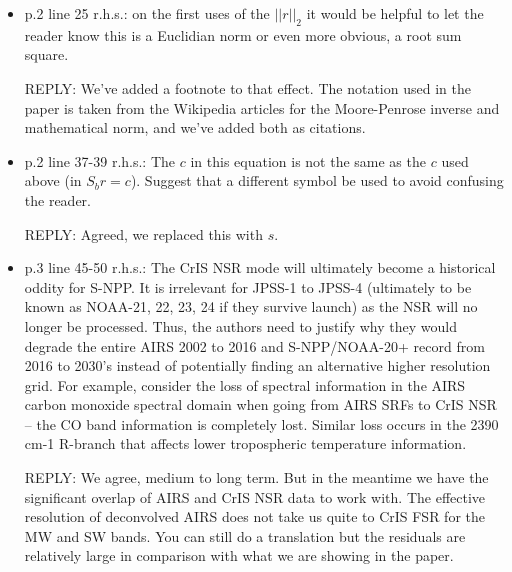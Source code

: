 \documentclass[11pt]{article}
\newcommand {\reply} {\mbox{\small REPLY}}
\begin{document}
\begin{itemize}
  \reply: It's interesting to look at the SRFs this way, and as you
  note the Gaussian approximation does not have the long tails of
  the tabulated SRFs.  We've added a comment to this effect.  But we
  aren't proposing to use the approximation as an alternative to the
  tabulated SRFS.  The applications are (1) reference truth for the
  deconvolved radiances at a different spacing and resolving power,
  used for validation of the deconvolution, and (2) basis functions
  for the idealized grating model of section~4.

\item p.2 line 25 r.h.s.: on the first uses of the $||r||_2$ it
  would be helpful to let the reader know this is a Euclidian norm
  or even more obvious, a root sum square.

  \reply: We've added a footnote to that effect.  The notation used
  in the paper is taken from the Wikipedia articles for the
  Moore-Penrose inverse and mathematical norm, and we've added both
  as citations.

\item p.2 line 37-39 r.h.s.: The $c$ in this equation is not the
  same as the $c$ used above (in $S_b r = c$). Suggest that a
  different symbol be used to avoid confusing the reader.

  \reply: Agreed, we replaced this with $s$.

\item p.3 line 45-50 r.h.s.: The CrIS NSR mode will ultimately
  become a historical oddity for S-NPP. It is irrelevant for JPSS-1
  to JPSS-4 (ultimately to be known as NOAA-21, 22, 23, 24 if they
  survive launch) as the NSR will no longer be processed. Thus, the
  authors need to justify why they would degrade the entire AIRS
  2002 to 2016 and S-NPP/NOAA-20+ record from 2016 to 2030’s instead
  of potentially finding an alternative higher resolution grid. For
  example, consider the loss of spectral information in the AIRS
  carbon monoxide spectral domain when going from AIRS SRFs to CrIS
  NSR – the CO band information is completely lost. Similar loss
  occurs in the 2390 cm-1 R-branch that affects lower tropospheric
  temperature information.

  \reply: We agree, medium to long term.  But in the meantime we
  have the significant overlap of AIRS and CrIS NSR data to work
  with.  The effective resolution of deconvolved AIRS does not take
  us quite to CrIS FSR for the MW and SW bands.  You can still do a
  translation but the residuals are relatively large in comparison
  with what we are showing in the paper.


\end{itemize}
\end{document}
